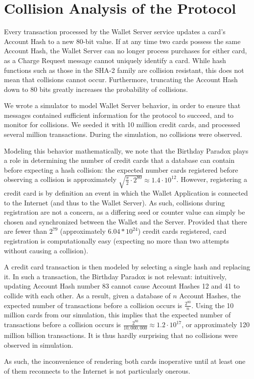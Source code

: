 \section{Collision Analysis of the Protocol}
\label{sec:collisions_and_simulations}

Every transaction processed by the Wallet Server service updates a card's Account Hash to a new 80-bit value.
If at any time two cards possess the same Account Hash, the Wallet Server can no longer process purchases for either card,
    as a Charge Request message cannot uniquely identify a card.
While hash functions such as those in the SHA-2 family are collision resistant, this does not mean that collisions cannot occur.
Furthermore, truncating the Account Hash down to 80 bits greatly increases the probability of collisions.

We wrote a simulator to model Wallet Server behavior, in order to ensure that messages contained sufficient information for the protocol to succeed,
    and to monitor for collisions.
We seeded it with 10 million credit cards, and processed several million transactions.
During the simulation, no collisions were observed.

Modeling this behavior mathematically, we note that the Birthday Paradox plays a role in determining the number of credit cards that a database can contain before expecting a hash collision:
the expected number cards registered before observing a collision is approximately
$\sqrt{\frac{\pi}{2} \cdot 2^{80}} \approx 1.4 \cdot 10^{12}$.
However, registering a credit card is by definition an event in which the Wallet Application is connected to the Internet (and thus to the Wallet Server).
As such, collisions during registration are not a concern, as a differing seed or counter value can simply be chosen and synchronized between the Wallet and the Server.
Provided that there are fewer than $2^{79}$ (approximately $6.04 * 10^{24}$) credit cards registered,
    card registration is computationally easy (expecting no more than two attempts without causing a collision).

A credit card transaction is then modeled by selecting a single hash and replacing it.
In such a transaction, the Birthday Paradox is not relevant:
intuitively, updating Account Hash number 83 cannot cause Account Hashes 12 and 41 to collide with each other.
As a result, given a database of $n$ Account Hashes, the expected number of transactions before a collision occurs is
$\frac{2^{80}}{n}$.
Using the 10 million cards from our simulation, this implies that the expected number of transactions before a collision occurs is
$\frac{2^{80}}{10,000,000} \approx 1.2 \cdot 10 ^ {17}$, or approximately 120 million billion transactions.
It is thus hardly surprising that no collisions were observed in simulation.

As such, the inconvenience of rendering both cards inoperative until at least one of them reconnects to the Internet is not particularly onerous.